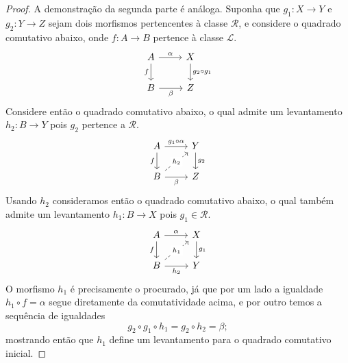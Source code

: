\begin{proof}
  A demonstração da segunda parte é análoga.
  Suponha que $g_{1}: X \to Y$ e $g_{2}: Y \to Z$ sejam dois morfismos pertencentes à classe $\mathcal{R}$, e considere o quadrado comutativo abaixo, onde $f: A \to B$ pertence à classe $\mathcal{L}$.
  \begin{displaymath}
    \begin{tikzcd}
      A
      \arrow[r, "\alpha"]
      \arrow[d, "f" swap]
      & X
      \arrow[d, "g_{2} \circ g_{1}"]
      \\ B
      \arrow[r, "\beta" swap]
      & Z
    \end{tikzcd}
  \end{displaymath}
  Considere então o quadrado comutativo abaixo, o qual admite um levantamento $h_{2}: B \to Y$ pois $g_{2}$ pertence a $\mathcal{R}$.
  \begin{displaymath}
    \begin{tikzcd}
      A
      \arrow[r, "g_{1} \circ \alpha"]
      \arrow[d, "f" swap]
      & Y
      \arrow[d, "g_{2}"]
      \\ B
      \arrow[r, "\beta" swap]
      \arrow[ru, dashed, "h_{2}" description]
      & Z
    \end{tikzcd}
  \end{displaymath}
  Usando $h_{2}$ consideramos então o quadrado comutativo abaixo, o qual também admite um levantamento $h_{1}: B \to X$ pois $g_{1} \in \mathcal{R}$.
  \begin{displaymath}
    \begin{tikzcd}
      A
      \arrow[r, "\alpha"]
      \arrow[d, "f" swap]
      & X
      \arrow[d, "g_{1}"]
      \\ B
      \arrow[r, "h_{2}" swap]
      \arrow[ru, dashed, "h_{1}" description]
      & Y
    \end{tikzcd}
  \end{displaymath}
  O morfismo $h_{1}$ é precisamente o procurado, já que por um lado a igualdade $h_{1} \circ f = \alpha$ segue diretamente da comutatividade acima, e por outro temos a sequência de igualdades
  \begin{displaymath}
    g_{2} \circ g_{1} \circ h_{1} = g_{2} \circ h_{2} = \beta;
  \end{displaymath}
  mostrando então que $h_{1}$ define um levantamento para o quadrado comutativo inicial.


\end{proof}

